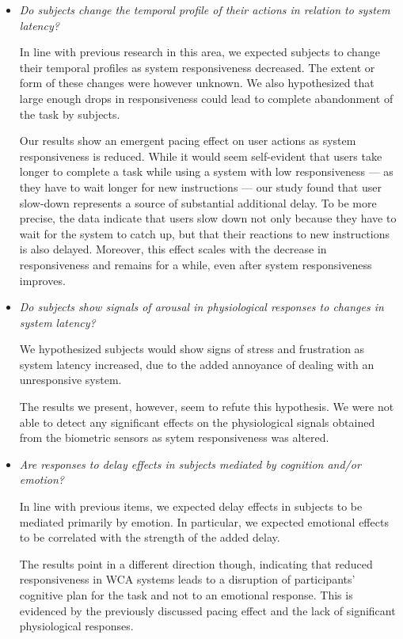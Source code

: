 \documentclass[10pt,letterpaper]{article}
\providecommand{\DIFaddbegin}{\protect\color{blue}} %
\newcommand{\DIFaddincludegraphics}[2][]{{\color{blue}\fbox{\DIFOincludegraphics[#1]{#2}}}} %
\DeclareRobustCommand{\DIFaddbegin}{\DIFOaddbegin \let\includegraphics\DIFaddincludegraphics} %
\begin{document}
\DIFaddbegin \begin{itemize}
  \item \emph{Do subjects change the temporal profile of their actions in relation to system latency?}

  In line with previous research in this area, we expected subjects to change their temporal profiles as system responsiveness decreased.
  The extent or form of these changes were however unknown.
  We also hypothesized that large enough drops in responsiveness could lead to complete abandonment of the task by subjects.

  Our results show an emergent pacing effect on user actions as system responsiveness is reduced.
  While it would seem self-evident that users take longer to complete a task while using a system with low responsiveness --- as they have to wait longer for new instructions --- our study found that user slow-down represents a source of substantial additional delay.
  To be more precise, the data indicate that users slow down not only because they have to wait for the system to catch up, but that their reactions to new instructions is also delayed.
  Moreover, this effect scales with the decrease in responsiveness and remains for a while, even after system responsiveness improves.

  \item \emph{Do subjects show signals of arousal in physiological responses to changes in system latency?}

  We hypothesized subjects would show signs of stress and frustration as system latency increased, due to the added annoyance of dealing with an unresponsive system.

  The results we present, however, seem to refute this hypothesis. 
  We were not able to detect any significant effects on the physiological signals obtained from the biometric sensors as sytem responsiveness was altered.

  \item \emph{Are responses to delay effects in subjects mediated by cognition and/or emotion?}

  In line with previous items, we expected delay effects in subjects to be mediated primarily by emotion.
  In particular, we expected emotional effects to be correlated with the strength of the added delay.

  The results point in a different direction though, indicating that reduced responsiveness in WCA systems leads to a disruption of participants' cognitive plan for the task and not to an emotional response.
  This is evidenced by the previously discussed pacing effect and the lack of significant physiological responses.


\end{itemize}
\end{document}
